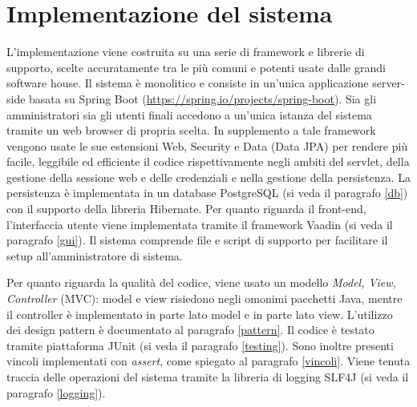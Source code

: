 %
%
%
%


\chapter{Implementazione del sistema}\label{implementazione}
L'implementazione viene costruita su una serie di framework e librerie di supporto, scelte accuratamente tra le più comuni e potenti usate dalle grandi software house. Il sistema è monolitico e consiste in un'unica applicazione server-side basata su Spring Boot (\url{https://spring.io/projects/spring-boot}). Sia gli amministratori sia gli utenti finali accedono a un'unica istanza del sistema tramite un web browser di propria scelta. In supplemento a tale framework vengono usate le sue estensioni Web, Security e Data (Data JPA) per rendere più facile, leggibile ed efficiente il codice rispettivamente negli ambiti del servlet, della gestione della sessione web e delle credenziali e nella gestione della persistenza. La persistenza è implementata in un database PostgreSQL (si veda il paragrafo \ref{db}) con il supporto della libreria Hibernate. Per quanto riguarda il front-end, l'interfaccia utente viene implementata tramite il framework Vaadin (si veda il paragrafo \ref{gui}). Il sistema comprende file e script di supporto per facilitare il setup all'amministratore di sistema.

Per quanto riguarda la qualità del codice, viene usato un modello \emph{Model, View, Controller} (MVC): model e view risiedono negli omonimi pacchetti Java, mentre il controller è implementato in parte lato model e in parte lato view. L'utilizzo dei design pattern è documentato al paragrafo \ref{pattern}. Il codice è testato tramite piattaforma JUnit (si veda il paragrafo \ref{testing}). Sono inoltre presenti vincoli implementati con \emph{assert}, come spiegato al paragrafo \ref{vincoli}. Viene tenuta traccia delle operazioni del sistema tramite la libreria di logging SLF4J (si veda il paragrafo \ref{logging}).

